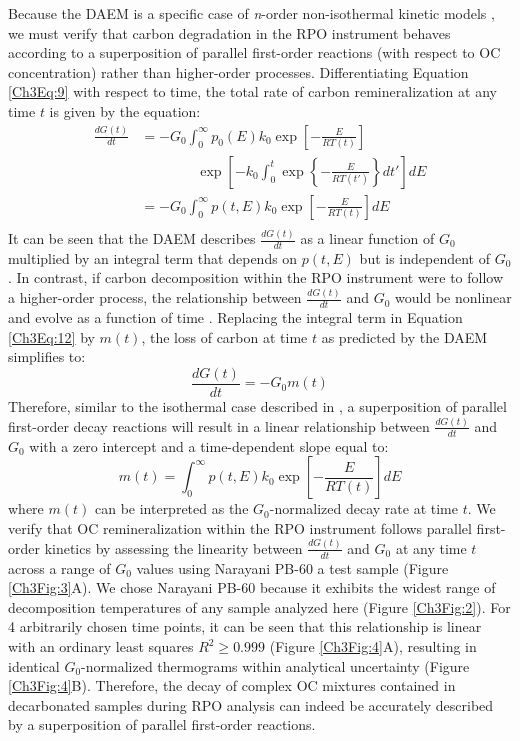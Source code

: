 Because the DAEM is a specific case of \textit{n}-order non-isothermal kinetic models \citep{Braun:1987vf,White:2011iz}, we must verify that carbon degradation in the RPO instrument behaves according to a superposition of parallel first-order reactions (with respect to OC concentration) rather than higher-order processes. Differentiating Equation \ref{Ch3Eq:9} with respect to time, the total rate of carbon remineralization at any time $t$ is given by the equation:
%
\begin{equation} \label{Ch3Eq:12}
	\begin{split}
	\frac{dG(t)}{dt}  & = - G_{0} \int_{0}^{\infty} p_{0}(E) k_{0} \exp \left[ - \frac{E}{RT(t)} \right] \\
		& \qquad\qquad \exp \left[ - k_{0} \int_{0}^{t} \exp \left\{ - \frac{E}{RT(t')} \right\} dt' \right] dE \\
	& = - G_{0} \int_{0}^{\infty} p(t, E) k_{0} \exp \left[ - \frac{E}{RT(t)} \right] dE \\
	\end{split}
\end{equation}
%
It can be seen that the DAEM describes $\frac{dG(t)}{dt}$ as a linear function of $G_{0}$ multiplied by an integral term that depends on $p(t,E)$ but is independent of $G_{0}$. In contrast, if carbon decomposition within the RPO instrument were to follow a higher-order process, the relationship between $\frac{dG(t)}{dt}$ and $G_{0}$ would be nonlinear and evolve as a function of time \citep[\textit{e.g.}][]{Follett:2014if}. Replacing the integral term in Equation \ref{Ch3Eq:12} by $m(t)$, the loss of carbon at time $t$ as predicted by the DAEM simplifies to:
%
\begin{equation} \label{Ch3Eq:13}
	\frac{dG(t)}{dt} = - G_{0} m(t)
\end{equation}
%
Therefore, similar to the isothermal case described in \citet{Follett:2014if}, a superposition of parallel first-order decay reactions will result in a linear relationship between $\frac{dG(t)}{dt}$ and $G_{0}$ with a zero intercept and a time-dependent slope equal to:
%
\begin{equation}\label{Ch3Eq:14}
 	m(t) = \int_{0}^{\infty} p(t, E) k_{0} \exp \left[ - \frac{E}{RT(t)} \right] dE
\end{equation}
%
where $m(t)$ can be interpreted as the $G_{0}$-normalized decay rate at time $t$. We verify that OC remineralization within the RPO instrument follows parallel first-order kinetics by assessing the linearity between $\frac{dG(t)}{dt}$ and $G_{0}$ at any time $t$ across a range of $G_{0}$ values using Narayani PB-60 a test sample (Figure \ref{Ch3Fig:3}A). We chose Narayani PB-60 because it exhibits the widest range of decomposition temperatures of any sample analyzed here (Figure \ref{Ch3Fig:2}). For 4 arbitrarily chosen time points, it can be seen that this relationship is linear with an ordinary least squares $R^{2} \geq 0.999$ (Figure \ref{Ch3Fig:4}A), resulting in identical $G_{0}$-normalized thermograms within analytical uncertainty (Figure \ref{Ch3Fig:4}B). Therefore, the decay of complex OC mixtures contained in decarbonated samples during RPO analysis can indeed be accurately described by a superposition of parallel first-order reactions.

